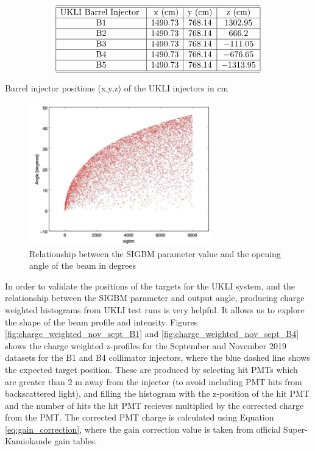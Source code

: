 \begin{table}[htp]
    $$
\begin{array}{|c|c|c|c|c|c|}  
    \hline \hline{\text {UKLI Barrel Injector }} & {\text { x (cm)}} & {\text {y (cm)}} & {\text {z (cm)}}  \tabularnewline
    \hline \text { B1 } & 1490.73 & 768.14 & 1302.95 \\
    \hline \text { B2 } & 1490.73 & 768.14 & 666.2 \\
    \hline \text { B3 } & 1490.73 & 768.14 & -111.05 \\
    \hline \text { B4 } & 1490.73 & 768.14 & -676.65 \\
    \hline \text { B5 } & 1490.73 & 768.14 &  -1313.95 \\
    \hline \hline 
\end{array}
    $$
\caption{Barrel injector positions (x,y,z) of the UKLI injectors in cm} 
\label{table:UKLI_loc}
\end{table}

\begin{figure}
    \centering
    \includegraphics[width=0.7\textwidth]{Figures/sigbm_angle.png}
    \caption{Relationship between the SIGBM parameter value and the opening angle of the beam in degrees}
    \label{fig:sigbm_angle}
\end{figure}

In order to validate the positions of the targets for the UKLI system, and the relationship between the SIGBM parameter and output angle, producing charge weighted histograms from UKLI test runs is very helpful. It allows us to explore the shape of the beam profile and intensity. Figures \ref{fig:charge_weighted_nov_sept_B1} and \ref{fig:charge_weighted_nov_sept_B4} shows the charge weighted z-profiles for the September and November 2019 datasets for the B1 and B4 collimator injectors, where the blue dashed line shows the expected target position. These are produced by selecting hit PMTs which are greater than 2 m away from the injector (to avoid including PMT hits from backscattered light), and filling the histogram with the z-position of the hit PMT and the number of hits the hit PMT recieves multiplied by the corrected charge from the PMT. The corrected PMT charge is calculated using Equation \ref{eq:gain_correction}, where the gain correction value is taken from official Super-Kamiokande gain tables. 


